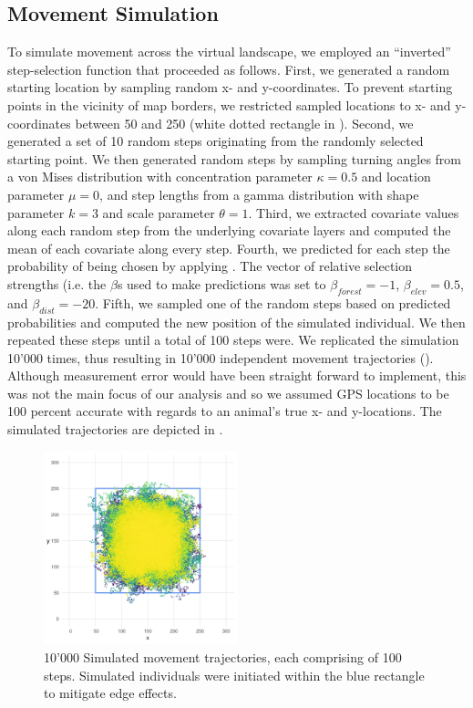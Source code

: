 \documentclass[abstract=on,10pt,a4paper,bibliography=totocnumbered]{article}
\begin{document}
\subsection{Movement Simulation}
To simulate movement across the virtual landscape, we employed an ``inverted''
step-selection function that proceeded as follows. First, we generated a random
starting location by sampling random x- and y-coordinates. To prevent starting
points in the vicinity of map borders, we restricted sampled locations to x- and
y-coordinates between 50 and 250 (white dotted rectangle in ).
Second, we generated a set of 10 random steps originating from the randomly
selected starting point. We then generated random steps by sampling turning
angles from a von Mises distribution with concentration parameter \(\kappa =
0.5\) and location parameter \( \mu = 0 \), and step lengths from a gamma
distribution with shape parameter \(k = 3 \) and scale parameter \(\theta = 1\).
Third, we extracted covariate values along each random step from the underlying
covariate layers and computed the mean of each covariate along every step.
Fourth, we predicted for each step the probability of being chosen by applying
. The vector of relative selection strengths (i.e. the \(\beta\)s used
to make predictions was set to \(\beta_{forest} = -1\), \(\beta_{elev} = 0.5\),
and \(\beta_{dist} = -20\). Fifth, we sampled one of the random steps based on
predicted probabilities and computed the new position of the simulated
individual. We then repeated these steps until a total of 100 steps were. We
replicated the simulation 10'000 times, thus resulting in 10'000 independent
movement trajectories (). Although measurement error would
have been straight forward to implement, this was not the main focus of our
analysis and so we assumed GPS locations to be 100 percent accurate with regards
to an animal's true x- and y-locations. The simulated trajectories are depicted
in .

\begin{figure}
  \begin{center}
  \includegraphics[width = 0.5\textwidth]{99_Simulations.png}
  \caption{10'000 Simulated movement trajectories, each comprising of 100 steps.
  Simulated individuals were initiated within the blue rectangle to mitigate
  edge effects.}
  \label{Simulations}
  \end{center}
\end{figure}
\end{document}
